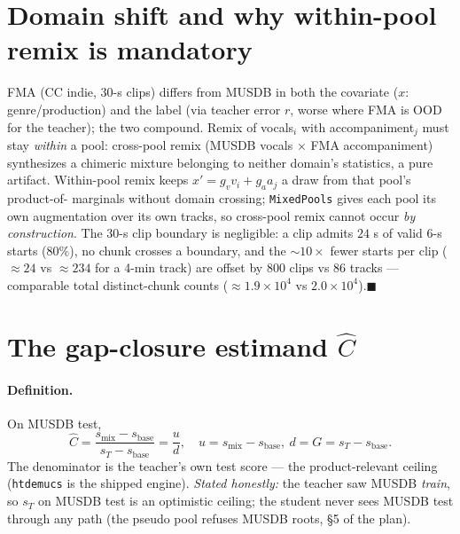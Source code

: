 \documentclass[11pt]{article}
\newcommand{\code}[1]{\texttt{#1}}
\newcommand{\sbase}{s_{\text{base}}}
\newcommand{\smix}{s_{\text{mix}}}
\newcommand{\sT}{s_T}
\newcommand{\Chat}{\hat C}
\begin{document}
\section{Domain shift and why within-pool remix is mandatory}

FMA (CC indie, 30-s clips) differs from MUSDB in both the covariate ($x$: genre/production) and the
label (via teacher error $r$, worse where FMA is OOD for the teacher); the two compound. Remix of
vocals$_i$ with accompaniment$_j$ must stay \emph{within} a pool: cross-pool remix (MUSDB vocals
$\times$ FMA accompaniment) synthesizes a chimeric mixture belonging to neither domain's statistics,
a pure artifact. Within-pool remix keeps $x'=g_v v_i+g_a a_j$ a draw from that pool's product-of-
marginals without domain crossing; \code{MixedPools} gives each pool its own augmentation over its
own tracks, so cross-pool remix cannot occur \emph{by construction}. The 30-s clip boundary is
negligible: a clip admits $24$ s of valid 6-s starts ($80\%$), no chunk crosses a boundary, and the
$\sim10\times$ fewer starts per clip ($\approx24$ vs $\approx234$ for a 4-min track) are offset by
$800$ clips vs $86$ tracks --- comparable total distinct-chunk counts
($\approx1.9\times10^4$ vs $2.0\times10^4$).\hfill$\blacksquare$

\section{The gap-closure estimand $\Chat$}

\paragraph{Definition.} On MUSDB test,
\[
\boxed{\ \Chat=\frac{\smix-\sbase}{\sT-\sbase}=\frac{u}{d},\quad u=\smix-\sbase,\ d=G=\sT-\sbase.\ }
\]
The denominator is the teacher's own test score --- the product-relevant ceiling (\code{htdemucs} is
the shipped engine). \emph{Stated honestly:} the teacher saw MUSDB \emph{train}, so $\sT$ on MUSDB
test is an optimistic ceiling; the student never sees MUSDB test through any path (the pseudo pool
refuses MUSDB roots, \S5 of the plan).
\end{document}
